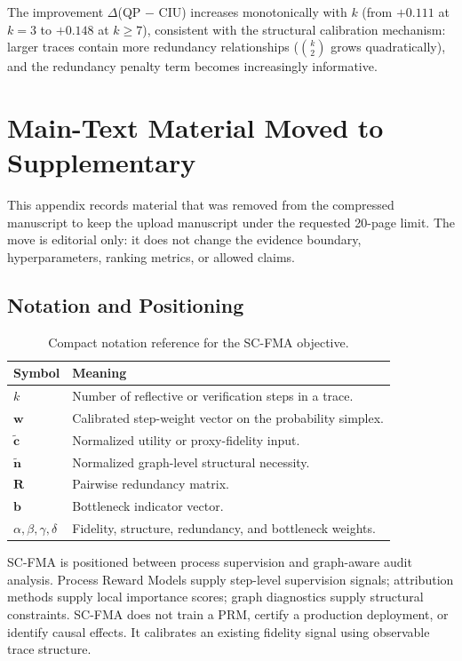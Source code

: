 \documentclass[a4paper,fleqn]{cas-sc}
\begin{document}
The improvement $\Delta$(QP $-$ CIU) increases monotonically with $k$ (from $+0.111$ at $k=3$ to $+0.148$ at $k \ge 7$), consistent with the structural calibration mechanism: larger traces contain more redundancy relationships ($\binom{k}{2}$ grows quadratically), and the redundancy penalty term becomes increasingly informative.

\section{Main-Text Material Moved to Supplementary}
\label{app:moved-main-material}

This appendix records material that was removed from the compressed manuscript to keep the upload manuscript under the requested 20-page limit. The move is editorial only: it does not change the evidence boundary, hyperparameters, ranking metrics, or allowed claims.

\subsection{Notation and Positioning}
\label{app:notation-positioning}

\begin{table}[ht]
\caption{Compact notation reference for the SC-FMA objective.}
\label{tab:supp-notation}
\centering
\small
\begin{tabular}{ll}
\toprule
\textbf{Symbol} & \textbf{Meaning} \\
\midrule
$k$ & Number of reflective or verification steps in a trace. \\
$\mathbf{w}$ & Calibrated step-weight vector on the probability simplex. \\
$\tilde{\mathbf{c}}$ & Normalized utility or proxy-fidelity input. \\
$\tilde{\mathbf{n}}$ & Normalized graph-level structural necessity. \\
$\mathbf{R}$ & Pairwise redundancy matrix. \\
$\mathbf{b}$ & Bottleneck indicator vector. \\
$\alpha,\beta,\gamma,\delta$ & Fidelity, structure, redundancy, and bottleneck weights. \\
\bottomrule
\end{tabular}
\end{table}

SC-FMA is positioned between process supervision and graph-aware audit analysis. Process Reward Models supply step-level supervision signals; attribution methods supply local importance scores; graph diagnostics supply structural constraints. SC-FMA does not train a PRM, certify a production deployment, or identify causal effects. It calibrates an existing fidelity signal using observable trace structure.
\end{document}
